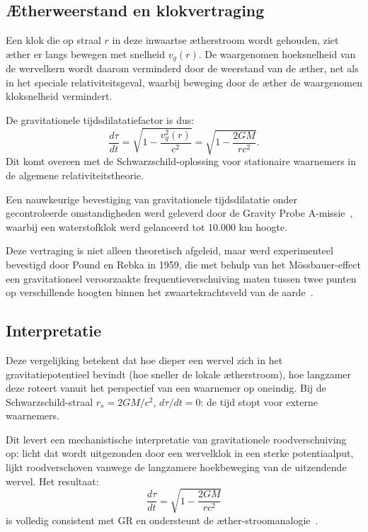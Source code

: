 \subsection*{Ætherweerstand en klokvertraging}

Een klok die op straal $r$ in deze inwaartse ætherstroom wordt gehouden, ziet æther er langs bewegen met snelheid $v_g(r)$. De waargenomen hoeksnelheid van de wervelkern wordt daarom verminderd door de weerstand van de æther, net als in het speciale relativiteitsgeval, waarbij beweging door de æther de waargenomen kloksnelheid vermindert.

De gravitationele tijdsdilatatiefactor is dus:
\[
    \frac{d\tau}{dt} = \sqrt{1 - \frac{v_g^2(r)}{c^2}} = \sqrt{1 - \frac{2GM}{rc^2}}. \tag{4}
\]
Dit komt overeen met de Schwarzschild-oplossing voor stationaire waarnemers in de algemene relativiteitstheorie.

Een nauwkeurige bevestiging van gravitationele tijdsdilatatie onder gecontroleerde omstandigheden werd geleverd door de Gravity Probe A-missie~\cite{vessot_levine_1980}, waarbij een waterstofklok werd gelanceerd tot 10.000 km hoogte.

Deze vertraging is niet alleen theoretisch afgeleid, maar werd experimenteel bevestigd door Pound en Rebka in 1959, die met behulp van het Mössbauer-effect een gravitationeel veroorzaakte frequentieverschuiving maten tussen twee punten op verschillende hoogten binnen het zwaartekrachtsveld van de aarde~\cite{pound_rebka_1959}.


\subsection*{Interpretatie}

Deze vergelijking betekent dat hoe dieper een wervel zich in het gravitatiepotentieel bevindt (hoe sneller de lokale ætherstroom), hoe langzamer deze roteert vanuit het perspectief van een waarnemer op oneindig. Bij de Schwarzschild-straal $r_s = 2GM/c^2$, $d\tau/dt = 0$: de tijd stopt voor externe waarnemers.

Dit levert een mechanistische interpretatie van gravitationele roodverschuiving op: licht dat wordt uitgezonden door een wervelklok in een sterke potentiaalput, lijkt roodverschoven vanwege de langzamere hoekbeweging van de uitzendende wervel. Het resultaat:
\[
    \boxed{\frac{d\tau}{dt} = \sqrt{1 - \frac{2GM}{rc^2}}}
\]
is volledig consistent met GR en ondersteunt de æther-stroomanalogie~\cite{Schiller2022-maxforce}.